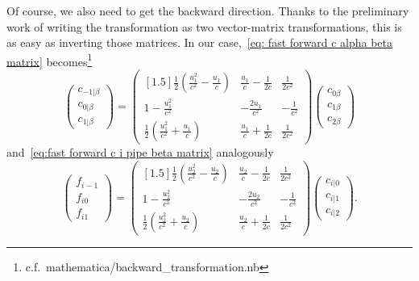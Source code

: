 Of course, we also need to get the backward direction.
Thanks to the preliminary work of writing the transformation as two vector-matrix transformations, this is as easy as inverting those matrices.
In our case,~\eqref{eq: fast forward c alpha beta matrix} becomes\footnote{c.f.\ mathematica/backward\_transformation.nb}
\begin{equation}
  \begin{pmatrix}
    c_{-1|\beta} \\
    c_{0|\beta} \\
    c_{1|\beta}
  \end{pmatrix}
  =  \begin{pmatrix}[1.5]
    \frac{1}{2}\left(\frac{u_1^2}{c^2}-\frac{u_1}{c}\right)
    & \frac{u_1}{c} - \frac{1}{2c}
    & \frac{1}{2 c^2}
    \\
    1-\frac{u_1^2}{c^2}
    & -\frac{2 u_1}{c^2}
    & -\frac{1}{c^2}
    \\
    \frac{1}{2}\left(\frac{u_1^2}{c^2}+\frac{u_1}{c}\right)
    & \frac{u_1}{c} + \frac{1}{2c}
    & \frac{1}{2 c^2}
  \end{pmatrix}
  \begin{pmatrix}
    c_{0\beta} \\
    c_{1\beta} \\
    c_{2\beta}
  \end{pmatrix}
\end{equation}
and~\eqref{eq:fast forward c i pipe beta matrix} analogously
\begin{equation}
  \begin{pmatrix}
    f_{i-1} \\
    f_{i0} \\
    f_{i1}
  \end{pmatrix}
  =
  \begin{pmatrix}[1.5]
    \frac{1}{2}\left(\frac{u_2^2}{c^2}-\frac{u_2}{c}\right)
    & \frac{u_2}{c} - \frac{1}{2c}
    & \frac{1}{2 c^2}
    \\
    1-\frac{u_2^2}{c^2}
    & -\frac{2 u_2}{c^2}
    & -\frac{1}{c^2}
    \\
    \frac{1}{2}\left(\frac{u_2^2}{c^2}+\frac{u_2}{c}\right)
    & \frac{u_2}{c} + \frac{1}{2c}
    & \frac{1}{2 c^2}
  \end{pmatrix}
  \begin{pmatrix}
      c_{i|0} \\
      c_{i|1} \\
      c_{i|2}
    \end{pmatrix}.
\end{equation}
